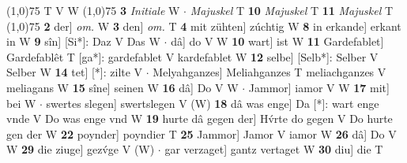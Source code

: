 \documentclass[8pt,a4paper,notitlepage]{article}
\begin{document}
\begin{table}[ht]
\begin{minipage}[t]{0.5\linewidth}
\begin{tabular}{rl}
\end{tabular}
\scriptsize
\line(1,0){75} \newline
T V W \newline
\line(1,0){75} \newline
\textbf{3} \textit{Initiale} W   $\cdot$ \textit{Majuskel} T  \textbf{10} \textit{Majuskel} T  \textbf{11} \textit{Majuskel} T  \newline
\line(1,0){75} \newline
\textbf{2} der] \textit{om.} W \textbf{3} den] \textit{om.} T \textbf{4} mit zühten] zúchtig W \textbf{8} in erkande] erkant in W \textbf{9} sîn] [Si*]: Daz V Das W  $\cdot$ dâ] do V W \textbf{10} wart] ist W \textbf{11} Gardefablet] Gardefablêt T [ga*]: gardefablet V kardefablet W \textbf{12} selbe] [Selb*]: Selber V Selber W \textbf{14} tet] [*]: zilte V  $\cdot$ Melyahganzes] Meliahganzes T meliachganzes V meliagans W \textbf{15} sîne] seinen W \textbf{16} dâ] Do V W  $\cdot$ Jammor] iamor V W \textbf{17} mit] bei W  $\cdot$ swertes slegen] swertslegen V (W) \textbf{18} dâ was enge] Da [*]: wart enge vnde V Do was enge vnd W \textbf{19} hurte dâ gegen der] Hv́rte do gegen V Do hurte gen der W \textbf{22} poynder] poyndier T \textbf{25} Jammor] Jamor V iamor W \textbf{26} dâ] Do V W \textbf{29} die ziuge] gezv́ge V (W)  $\cdot$ gar verzaget] gantz vertaget W \textbf{30} diu] die T \newline
\end{minipage}
\end{table}
\end{document}
